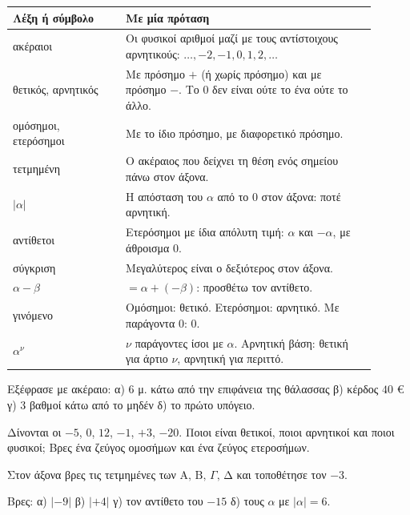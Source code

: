 

\renewcommand{\arraystretch}{1.5}
\begin{longtable}{@{}>{\raggedright\arraybackslash}p{0.28\linewidth} >{\raggedright\arraybackslash}p{0.62\linewidth}@{}}
\toprule
\textbf{Λέξη ή σύμβολο} & \textbf{Με μία πρόταση}\\
\midrule
\endhead
ακέραιοι & Οι φυσικοί αριθμοί μαζί με τους αντίστοιχους αρνητικούς: $\dots,-2,-1,0,1,2,\dots$\\
θετικός, αρνητικός & Με πρόσημο $+$ (ή χωρίς πρόσημο) και με πρόσημο $-$. Το $0$ δεν είναι ούτε το ένα ούτε το άλλο.\\
ομόσημοι, ετερόσημοι & Με το ίδιο πρόσημο, με διαφορετικό πρόσημο.\\
τετμημένη & Ο ακέραιος που δείχνει τη θέση ενός σημείου πάνω στον άξονα.\\
$|\alpha|$ & Η απόσταση του $\alpha$ από το $0$ στον άξονα: ποτέ αρνητική.\\
αντίθετοι & Ετερόσημοι με ίδια απόλυτη τιμή: $\alpha$ και $-\alpha$, με άθροισμα $0$.\\
σύγκριση & Μεγαλύτερος είναι ο δεξιότερος στον άξονα.\\
$\alpha-\beta$ & $=\alpha+(-\beta)$: προσθέτω τον αντίθετο.\\
γινόμενο & Ομόσημοι: θετικό. Ετερόσημοι: αρνητικό. Με παράγοντα $0$: $0$.\\
$\alpha^{\nu}$ & $\nu$ παράγοντες ίσοι με $\alpha$. Αρνητική βάση: θετική για άρτιο $\nu$, αρνητική για περιττό.\\
\bottomrule
\end{longtable}


\ex Εξέφρασε με ακέραιο: α) $6$ μ. κάτω από την επιφάνεια της θάλασσας \quad β) κέρδος $40$ € \quad γ) $3$ βαθμοί κάτω από το μηδέν \quad δ) το πρώτο υπόγειο.

\ex Δίνονται οι $-5$, $0$, $12$, $-1$, $+3$, $-20$. Ποιοι είναι θετικοί, ποιοι αρνητικοί και ποιοι φυσικοί; Βρες ένα ζεύγος ομοσήμων και ένα ζεύγος ετεροσήμων.

\ex Στον άξονα βρες τις τετμημένες των $\mathrm{Α},\,\mathrm{Β},\,\Gamma,\,\mathrm{Δ}$ και τοποθέτησε τον $-3$.
\begin{center}
\end{center}

\ex Βρες: α) $|-9|$ \quad β) $|+4|$ \quad γ) τον αντίθετο του $-15$ \quad δ) τους $\alpha$ με $|\alpha|=6$.


